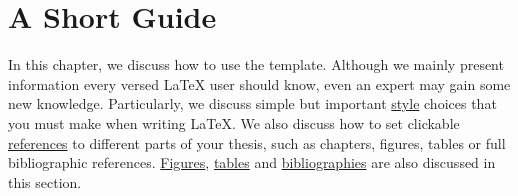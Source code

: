 \chapter{A Short Guide}
\label{ch:guide}
In this chapter, we discuss how to use the \ac{template}.
Although we mainly present information every versed \LaTeX{} user should know,
even an expert may gain some new knowledge.
Particularly, we discuss simple but important \hyperref[sec:guide:style]{style}
choices that you must make when writing \LaTeX{}.
We also discuss how to set clickable
\hyperref[sec:guide:references]{references} to different parts of your
thesis, such as chapters, figures, tables or full bibliographic references.
\hyperref[sec:guide:graphics]{Figures}, \hyperref[sec:guide:tables]{tables} and
\hyperref[sec:guide:bibliographies]{bibliographies} are also discussed in this
section. 






